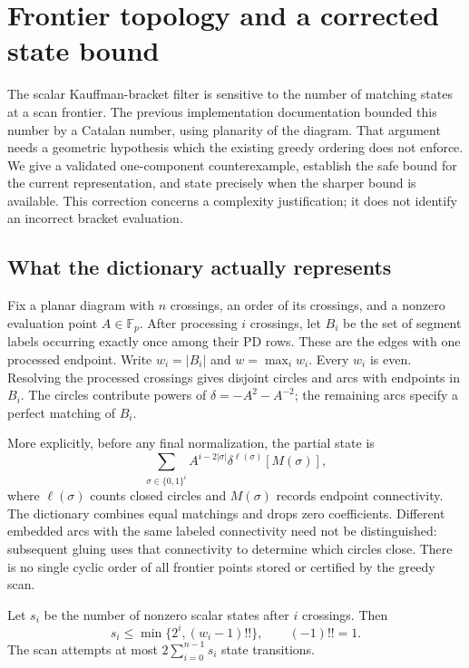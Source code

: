 \section{Frontier topology and a corrected state bound}
\label{sec:frontiers}

The scalar Kauffman-bracket filter is sensitive to the number of matching states
at a scan frontier.  The previous implementation documentation bounded this
number by a Catalan number, using planarity of the diagram.  That argument needs
a geometric hypothesis which the existing greedy ordering does not enforce.
We give a validated one-component counterexample, establish the safe bound for
the current representation, and state precisely when the sharper bound is
available.  This correction concerns a complexity justification; it does not
identify an incorrect bracket evaluation.

\subsection{What the dictionary actually represents}

Fix a planar diagram with $n$ crossings, an order of its crossings, and a nonzero
evaluation point $A\in\mathbb{F}_p$.  After processing $i$ crossings, let $B_i$ be the
set of segment labels occurring exactly once among their PD rows.  These are
the edges with one processed endpoint.  Write $w_i=|B_i|$ and
$w=\max_i w_i$.  Every $w_i$ is even.  Resolving the processed crossings gives
disjoint circles and arcs with endpoints in $B_i$.  The circles contribute
powers of $\delta=-A^2-A^{-2}$; the remaining arcs specify a perfect matching
of $B_i$.

More explicitly, before any final normalization, the partial state is
\begin{equation}
 \sum_{\sigma\in\{0,1\}^i}
 A^{i-2|\sigma|}\delta^{\ell(\sigma)}[M(\sigma)],
 \label{eq:partial-bracket}
\end{equation}
where $\ell(\sigma)$ counts closed circles and $M(\sigma)$ records endpoint
connectivity.  The dictionary combines equal matchings and drops zero
coefficients.  Different embedded arcs with the same labeled connectivity need
not be distinguished: subsequent gluing uses that connectivity to determine
which circles close.  There is no single cyclic order of all frontier points
stored or certified by the greedy scan.

\begin{proposition}
\label{prop:frontier-matching-count}
Let $s_i$ be the number of nonzero scalar states after $i$ crossings.  Then
\begin{equation}
 s_i\leq\min\{2^i,(w_i-1)!!\},\qquad (-1)!!=1.
 \label{eq:frontier-matching-count}
\end{equation}
The scan attempts at most $2\sum_{i=0}^{n-1}s_i$ state transitions.
\end{proposition}

